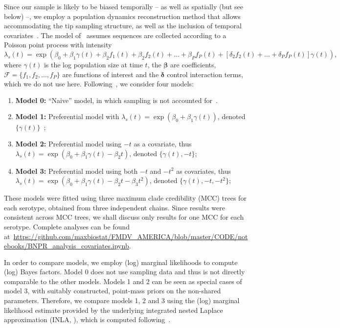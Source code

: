 \documentclass[a4paper,10pt]{article}
\begin{document}
Since our sample is likely to be biased temporally -- as well as spatially (but see below) --, we employ a population dynamics reconstruction method that allows accommodating the tip sampling structure, as well as the inclusion of temporal covariates~\citep{M-Karcher2019}.
The model of~\cite{M-Karcher2019} assumes sequences are collected according to a Poisson point process with intensity
\begin{equation}
 \label{eq:skytrack}
 \lambda_s(t) = \exp\left( \beta_0 + \beta_1\gamma(t) + \beta_2 f_1(t)  + \beta_2 f_2(t) + \ldots + \beta_P f_P(t) + \left[\delta_2 f_2(t) + \ldots + \delta_P f_P(t) \right]\gamma(t) \right),
\end{equation}
where $\gamma(t)$ is the log population size at time $t$, the $\boldsymbol\beta$ are coefficients, $\mathcal{F} = \{f_1, f_2, \ldots, f_P\}$ are functions of interest and the $\boldsymbol\delta$ control interaction terms, which we do not use here.
Following~\cite{M-Karcher2019}, we consider four models:
\begin{enumerate}
 \item \textbf{Model 0:} ``Naive'' model, in which sampling is not accounted for~\citep{Palacios2015}.
 \item \textbf{Model 1:} Preferential model with $\lambda_s(t) = \exp(\beta_0 + \beta_1\gamma(t))$, denoted $\{\gamma(t)\}$~\citep{M-Karcher2016};
 \item \textbf{Model 2:} Preferential model using $-t$ as a covariate, thus $\lambda_s(t) = \exp(\beta_0 + \beta_1\gamma(t) -\beta_2 t)$, denoted $\{\gamma(t), -t\}$;
 \item \textbf{Model 3:} Preferential model using both $-t$ and $-t^2$ as covariates, thus $\lambda_s(t) = \exp(\beta_0 + \beta_1\gamma(t) -\beta_2 t - \beta_3t^2)$, denoted $\{\gamma(t), -t, -t^2\}$;
\end{enumerate}

These models were fitted using three maximum clade credibility (MCC) trees for each serotype, obtained from three independent chains. %
Since results were consistent across MCC trees, we shall discuss only results for one MCC for each serotype.
Complete analyses can be found at~\url{https://github.com/maxbiostat/FMDV_AMERICA/blob/master/CODE/notebooks/BNPR_analysis_covariates.ipynb}.

In order to compare models, we employ (log) marginal likelihoods to compute (log) Bayes factors.
Model 0 does not use sampling data and thus is not directly comparable to the other models.
Models 1 and 2 can be seen as special cases of model 3, with suitably constructed, point-mass priors on the non-shared parameters.
Therefore, we compare models 1, 2 and 3 using the (log) marginal likelihood estimate provided by the underlying integrated nested Laplace approximation (INLA, \cite{Martins2013}), which is computed following~\citet{Hubin2016}.
\end{document}
